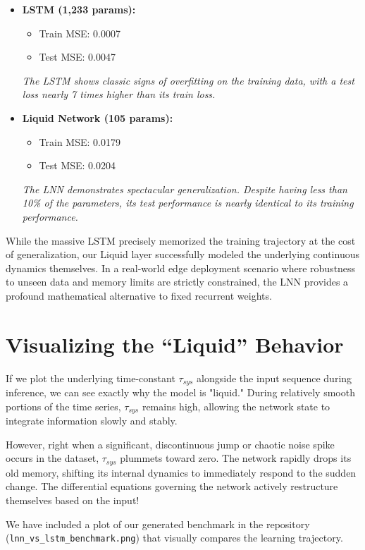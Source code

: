 \documentclass[12pt]{article}
\begin{document}
\begin{itemize}
    \item \textbf{LSTM (1,233 params):} 
    \begin{itemize}
        \item Train MSE: 0.0007
        \item Test MSE: 0.0047
    \end{itemize}
    \textit{The LSTM shows classic signs of overfitting on the training data, with a test loss nearly 7 times higher than its train loss.}
    
    \item \textbf{Liquid Network (105 params):} 
    \begin{itemize}
        \item Train MSE: 0.0179
        \item Test MSE: 0.0204
    \end{itemize}
    \textit{The LNN demonstrates spectacular generalization. Despite having less than 10\% of the parameters, its test performance is nearly identical to its training performance.}
\end{itemize}

While the massive LSTM precisely memorized the training trajectory at the cost of generalization, our Liquid layer successfully modeled the underlying continuous dynamics themselves. In a real-world edge deployment scenario where robustness to unseen data and memory limits are strictly constrained, the LNN provides a profound mathematical alternative to fixed recurrent weights.

\section*{Visualizing the ``Liquid'' Behavior}
If we plot the underlying time-constant $\tau_{sys}$ alongside the input sequence during inference, we can see exactly why the model is "liquid." During relatively smooth portions of the time series, $\tau_{sys}$ remains high, allowing the network state to integrate information slowly and stably. 

However, right when a significant, discontinuous jump or chaotic noise spike occurs in the dataset, $\tau_{sys}$ plummets toward zero. The network rapidly drops its old memory, shifting its internal dynamics to immediately respond to the sudden change. The differential equations governing the network actively restructure themselves based on the input!

We have included a plot of our generated benchmark in the repository (\texttt{lnn\_vs\_lstm\_benchmark.png}) that visually compares the learning trajectory. 
\end{document}
